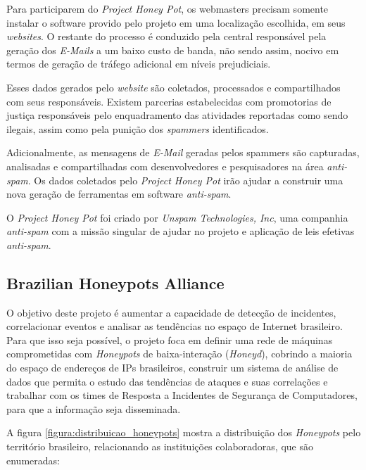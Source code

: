 Para participarem do \textit{Project Honey Pot}, os webmasters precisam somente instalar o software provido pelo projeto em uma localização escolhida, em seus \textit{websites}. O restante do processo é conduzido pela central responsável pela geração dos \textit{E-Mails} a um baixo custo de banda, não sendo assim, nocivo em termos de geração de tráfego adicional em níveis prejudiciais.

Esses dados gerados pelo \textit{website} são coletados, processados e compartilhados com seus responsáveis. Existem parcerias estabelecidas com promotorias de justiça responsáveis pelo enquadramento das atividades reportadas como sendo ilegais, assim como pela punição dos \textit{spammers} identificados.

Adicionalmente, as mensagens de \textit{E-Mail} geradas pelos spammers são capturadas, analisadas e compartilhadas com desenvolvedores e pesquisadores na área \textit{anti-spam}. Os dados coletados pelo \textit{Project Honey Pot} irão ajudar a construir uma nova geração de ferramentas em software \textit{anti-spam}.

O \textit{Project Honey Pot} foi criado por \textit{Unspam Technologies, Inc}, uma companhia \textit{anti-spam} com a missão singular de ajudar no projeto e aplicação de leis efetivas \textit{anti-spam}.


\subsection{Brazilian Honeypots Alliance}

O objetivo deste projeto é aumentar a capacidade de detecção de incidentes, correlacionar eventos e analisar as tendências no espaço de Internet brasileiro. Para que isso seja possível, o projeto foca em definir uma rede de máquinas comprometidas com \textit{Honeypots} de baixa-interação (\textit{Honeyd}), cobrindo a maioria do espaço de endereços de IPs brasileiros, construir um sistema de análise de dados que permita o estudo das tendências de ataques e suas correlações e trabalhar com os times de Resposta a Incidentes de Segurança de Computadores, para que a informação seja disseminada.


A figura \ref{figura:distribuicao_honeypots} mostra a distribuição dos \textit{Honeypots} pelo território brasileiro, relacionando as instituições colaboradoras, que são enumeradas:

